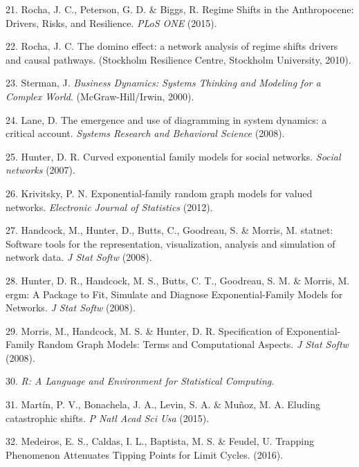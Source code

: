 \documentclass[9pt,]{article}
\begin{document}
\hypertarget{ref-Rocha:2015du}{}
21. Rocha, J. C., Peterson, G. D. \& Biggs, R. Regime Shifts in the
Anthropocene: Drivers, Risks, and Resilience. \emph{PLoS ONE} (2015).

\hypertarget{ref-Rocha:2010vv}{}
22. Rocha, J. C. The domino effect: a network analysis of regime shifts
drivers and causal pathways. (Stockholm Resilience Centre, Stockholm
University, 2010).

\hypertarget{ref-Sterman:2000we}{}
23. Sterman, J. \emph{Business Dynamics: Systems Thinking and Modeling
for a Complex World}. (McGraw-Hill/Irwin, 2000).

\hypertarget{ref-Lane:2008p6781}{}
24. Lane, D. The emergence and use of diagramming in system dynamics: a
critical account. \emph{Systems Research and Behavioral Science} (2008).

\hypertarget{ref-Hunter:2007bq}{}
25. Hunter, D. R. Curved exponential family models for social networks.
\emph{Social networks} (2007).

\hypertarget{ref-Krivitsky:2012uo}{}
26. Krivitsky, P. N. Exponential-family random graph models for valued
networks. \emph{Electronic Journal of Statistics} (2012).

\hypertarget{ref-Handcock:2008p5095}{}
27. Handcock, M., Hunter, D., Butts, C., Goodreau, S. \& Morris, M.
statnet: Software tools for the representation, visualization, analysis
and simulation of network data. \emph{J Stat Softw} (2008).

\hypertarget{ref-Hunter:2008vh}{}
28. Hunter, D. R., Handcock, M. S., Butts, C. T., Goodreau, S. M. \&
Morris, M. ergm: A Package to Fit, Simulate and Diagnose
Exponential-Family Models for Networks. \emph{J Stat Softw} (2008).

\hypertarget{ref-Morris:2008ty}{}
29. Morris, M., Handcock, M. S. \& Hunter, D. R. Specification of
Exponential-Family Random Graph Models: Terms and Computational Aspects.
\emph{J Stat Softw} (2008).

\hypertarget{ref-RCoreTeam:2012wf}{}
30. \emph{R: A Language and Environment for Statistical Computing}.

\hypertarget{ref-Martin:2015kl}{}
31. Martín, P. V., Bonachela, J. A., Levin, S. A. \& Muñoz, M. A.
Eluding catastrophic shifts. \emph{P Natl Acad Sci Usa} (2015).

\hypertarget{ref-Medeiros:2016vf}{}
32. Medeiros, E. S., Caldas, I. L., Baptista, M. S. \& Feudel, U.
Trapping Phenomenon Attenuates Tipping Points for Limit Cycles. (2016).
\end{document}
